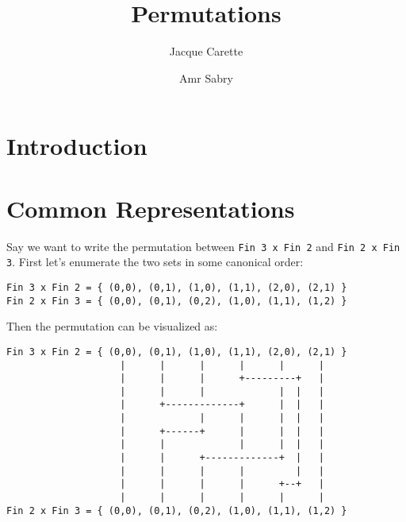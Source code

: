 \documentclass{llncs}
\begin{document}
\title{Permutations}
\author{Jacque Carette \and Amr Sabry}
\maketitle

\begin{abstract}

\keywords{}
\end{abstract}

\section{Introduction}

\section{Common Representations}

Say we want to write the permutation between \verb|Fin 3 x Fin 2| and
\verb|Fin 2 x Fin 3|. First let's enumerate the two sets in some
canonical order:
\begin{verbatim}
Fin 3 x Fin 2 = { (0,0), (0,1), (1,0), (1,1), (2,0), (2,1) } 
Fin 2 x Fin 3 = { (0,0), (0,1), (0,2), (1,0), (1,1), (1,2) }
\end{verbatim}

Then the permutation can be visualized as:

\begin{verbatim} 
Fin 3 x Fin 2 = { (0,0), (0,1), (1,0), (1,1), (2,0), (2,1) }
                    |      |      |      |      |      |
                    |      |      |      +---------+   |
                    |      |      |             |  |   |
                    |      +-------------+      |  |   |
                    |             |      |      |  |   |
                    |      +------+      |      |  |   |
                    |      |             |      |  |   |
                    |      |      +-------------+  |   |
                    |      |      |      |         |   |
                    |      |      |      |      +--+   |
                    |      |      |      |      |      |
Fin 2 x Fin 3 = { (0,0), (0,1), (0,2), (1,0), (1,1), (1,2) }
\end{verbatim}
\end{document}
